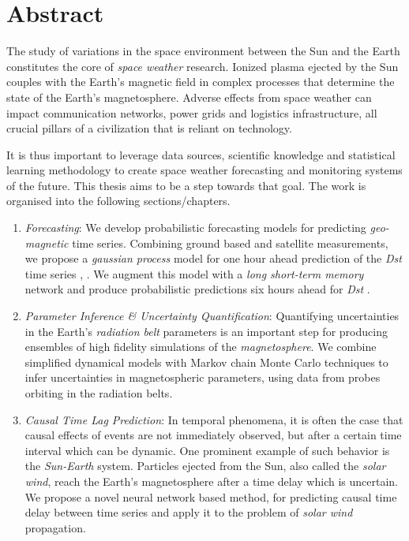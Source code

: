 \chapter*{Abstract}\label{chapter:abstract}

The study of variations in the space environment between the Sun and the Earth constitutes 
the core of \textit{space weather} research. Ionized plasma ejected by the Sun couples with 
the Earth’s magnetic field in complex processes that determine the state of the Earth's 
magnetosphere. Adverse effects from space weather can impact communication networks, 
power grids and logistics infrastructure, all crucial pillars of a civilization that 
is reliant on technology.

It is thus important to leverage data sources, scientific knowledge and statistical learning 
methodology to create space weather forecasting and monitoring systems of the future. This 
thesis aims to be a step towards that goal. The work is organised into the following 
sections/chapters.

\begin{enumerate}
\item \textit{Forecasting}: We develop probabilistic forecasting models for predicting 
\textit{geo-magnetic} time series. Combining ground based and satellite measurements, 
we propose a \textit{gaussian process} model for one hour ahead prediction of the \textit{Dst} 
time series \cite{ChandorkarDst}, \cite{CHANDORKAR2018237}. We augment this model with a 
\textit{long short-term memory} network and produce probabilistic predictions six hours 
ahead for \textit{Dst} \cite{doi:10.1029/2018SW001898}.

\item \textit{Parameter Inference \& Uncertainty Quantification}: Quantifying uncertainties in the 
Earth's \textit{radiation belt} parameters is an important step for producing ensembles of high 
fidelity simulations of the \textit{magnetosphere}. We combine simplified dynamical models with 
Markov chain Monte Carlo techniques to infer uncertainties in magnetospheric parameters, 
using data from probes orbiting in the radiation belts.

\item \textit{Causal Time Lag Prediction}: In temporal phenomena, it is often the case 
that causal effects of events are not immediately observed, but after a certain time interval 
which can be dynamic. One prominent example of such behavior is the \textit{Sun-Earth} system. 
Particles ejected from the Sun, also called the \textit{solar wind}, reach the Earth's magnetosphere 
after a time delay which is uncertain. We propose a novel neural network based method, for 
predicting causal time delay between time series and apply it to the problem of 
\textit{solar wind} propagation.

\end{enumerate}





